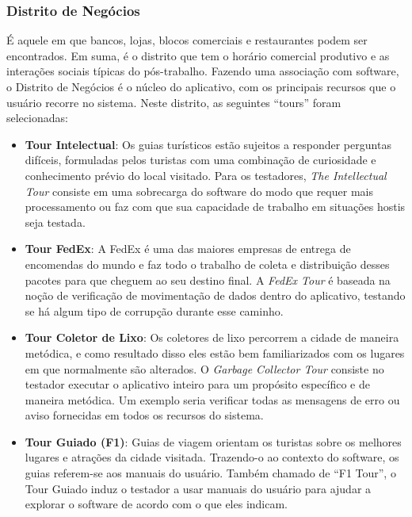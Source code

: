 \subsubsection{Distrito de Negócios}

É aquele em que bancos, lojas, blocos comerciais e restaurantes podem ser encontrados. Em suma, é o distrito que tem o horário comercial produtivo e as interações sociais típicas do pós-trabalho. Fazendo uma associação com software, o Distrito de Negócios é o núcleo do aplicativo, com os principais recursos que o usuário recorre no sistema. Neste distrito, as seguintes ``tours'' foram selecionadas:

\begin {itemize}
    \item \textbf {Tour Intelectual}: Os guias turísticos estão sujeitos a responder perguntas difíceis, formuladas pelos turistas com uma combinação de curiosidade e conhecimento prévio do local visitado. Para os testadores, \textit{The Intellectual Tour} consiste em uma sobrecarga do software do modo que requer mais processamento ou faz com que sua capacidade de trabalho em situações hostis seja testada.
    \item \textbf {Tour FedEx}: A FedEx é uma das maiores empresas de entrega de encomendas do mundo e faz todo o trabalho de coleta e distribuição desses pacotes para que cheguem ao seu destino final. A \textit{FedEx Tour} é baseada na noção de verificação de movimentação de dados dentro do aplicativo, testando se há algum tipo de corrupção durante esse caminho.

    \item \textbf {Tour Coletor de Lixo}: Os coletores de lixo percorrem a cidade de maneira metódica, e como resultado disso eles estão bem familiarizados com os lugares em que normalmente são alterados. O \textit{Garbage Collector Tour} consiste no testador executar o aplicativo inteiro para um propósito específico e de maneira metódica. Um exemplo seria verificar todas as mensagens de erro ou aviso fornecidas em todos os recursos do sistema.
    \item \textbf {Tour Guiado (F1)}: Guias de viagem orientam os turistas sobre os melhores lugares e atrações da cidade visitada. Trazendo-o ao contexto do software, os guias referem-se aos manuais do usuário. Também chamado de ``F1 Tour'', o Tour Guiado induz o testador a usar manuais do usuário para ajudar a explorar o software de acordo com o que eles indicam.
\end {itemize}

